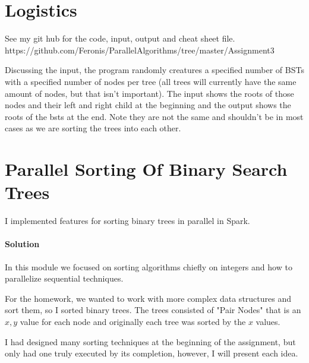\documentclass[titlepage]{article}
\author{
        Justin Baraboo, class ID 2\\
	group 1
	Homework 3\\
       }
\title{}
\date{\today}
\begin{document}
\maketitle


\section{Logistics}
See my git hub for the code, input, output and cheat sheet file.\\
https://github.com/Feronis/ParallelAlgorithms/tree/master/Assignment3

Discussing the input, the program randomly creatures a specified number of BSTs with a specified number of nodes per tree (all trees will currently have the same amount of nodes, but that isn't important).  The input shows the roots of those nodes and their left and right child at the beginning and the output shows the roots of the bsts at the end. Note they are not the same and shouldn't be in most cases as we are sorting the trees into each other.


\section{Parallel Sorting Of Binary Search Trees}
I implemented features for sorting binary trees in parallel in Spark.

\paragraph{Solution}
In this module we focused on sorting algorithms chiefly on integers and how to parallelize sequential techniques.

For the homework, we wanted to work with more complex data structures and sort them, so I sorted binary trees.
The trees consisted of "Pair Nodes" that is an $x,y$ value for each node and originally each tree was sorted by the $x$ values.

I had designed many sorting techniques at the beginning of the assignment, but only had one truly executed by its completion, however, I will present each idea.
\end{document}
